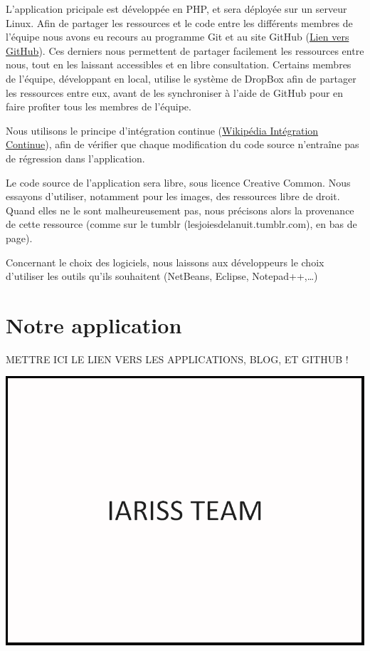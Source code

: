 \documentclass[12pt, a4paper]{article}
\newcommand{\espace}{\vspace{.8cm}}
\begin{document}
L'application pricipale est développée en PHP, et sera déployée sur un serveur Linux. Afin de partager les ressources et le code entre les différents membres de l'équipe nous avons eu recours au programme Git et au site GitHub (\href{https://github.com/}{Lien vers GitHub}). Ces derniers nous permettent de partager facilement les ressources entre nous, tout en les laissant accessibles et en libre consultation.
Certains membres de l'équipe, développant en local, utilise le système de DropBox afin de partager les ressources entre eux, avant de les synchroniser à l'aide de GitHub pour en faire profiter tous les membres de l'équipe.

Nous utilisons le principe d'intégration continue (\href{http://fr.wikipedia.org/wiki/Int\%C3\%A9gration_continue}{Wikipédia Intégration Continue}), afin de vérifier que chaque modification du code source n'entraîne pas de régression dans l'application.

Le code source de l'application sera libre, sous licence Creative Common. Nous essayons d'utiliser, notamment pour les images, des ressources libre de droit. Quand elles ne le sont malheureusement pas, nous précisons alors la provenance de cette ressource (comme sur le tumblr (lesjoiesdelanuit.tumblr.com), en bas de page).

Concernant le choix des logiciels, nous laissons aux développeurs le choix d'utiliser les outils qu'ils souhaitent (NetBeans, Eclipse, Notepad++,\ldots{})

\espace{}
\section*{Notre application}
METTRE ICI LE LIEN VERS LES APPLICATIONS, BLOG, ET GITHUB !
\espace{}
\begin{center}
\includegraphics[width=.9\textwidth, keepaspectratio=true]{img/test.png}
\end{center}
\end{document}
